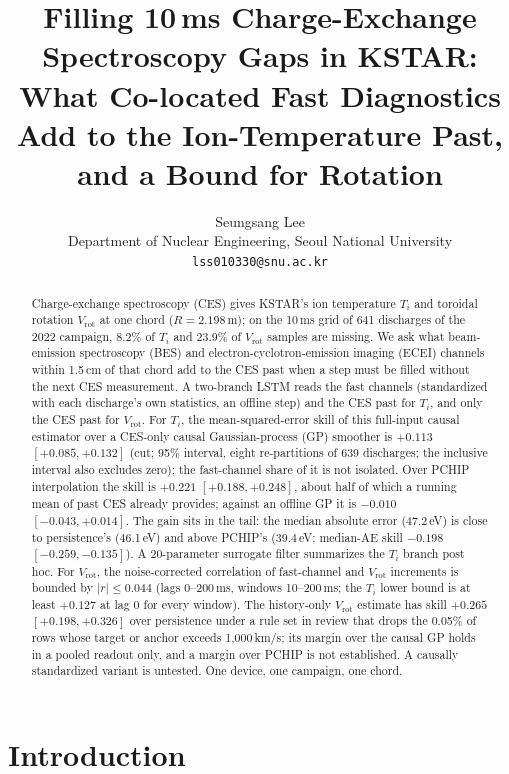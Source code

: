 \documentclass[10pt,twocolumn,letterpaper]{article}
\title{\vspace{-0.3in}\large\textbf{Filling 10\,ms Charge-Exchange Spectroscopy Gaps in KSTAR:
What Co-located Fast Diagnostics Add to the Ion-Temperature Past,
and a Bound for Rotation}}
\author{Seungsang Lee\\
  {\small Department of Nuclear Engineering, Seoul National University}\quad
  {\small\texttt{lss010330@snu.ac.kr}}}
\date{\vspace{-0.25in}}
\newcommand{\Ti}{\ensuremath{T_i}}
\newcommand{\Vrot}{\ensuremath{V_\mathrm{rot}}}
\begin{document}
\maketitle

\begin{abstract}
Charge-exchange spectroscopy (CES) gives KSTAR's ion temperature \Ti{} and toroidal
rotation \Vrot{} at one chord ($R = 2.198$\,m); on the 10\,ms grid of 641 discharges of
the 2022 campaign, 8.2\% of \Ti{} and 23.9\% of \Vrot{} samples are missing. We ask what
beam-emission spectroscopy (BES) and electron-cyclotron-emission imaging (ECEI) channels
within 1.5\,cm of that chord add to the CES past when a step must be filled without the
next CES measurement. A two-branch LSTM reads the fast channels (standardized with each
discharge's own statistics, an offline step) and the CES past for \Ti{}, and only the
CES past for \Vrot{}. For \Ti{}, the mean-squared-error skill of this full-input causal
estimator over a CES-only causal Gaussian-process (GP) smoother is $+0.113$
$[+0.085, +0.132]$ (cut; 95\% interval, eight re-partitions of 639 discharges; the
inclusive interval also excludes zero); the fast-channel share of it is not isolated.
Over PCHIP interpolation the skill is $+0.221$ $[+0.188, +0.248]$, about half of which
a running mean of past CES already provides; against an offline GP it is $-0.010$
$[-0.043, +0.014]$. The gain sits in the tail: the median absolute error (47.2\,eV) is
close to persistence's (46.1\,eV) and above PCHIP's (39.4\,eV; median-AE skill $-0.198$
$[-0.259, -0.135]$). A 20-parameter surrogate filter summarizes the \Ti{} branch post
hoc. For \Vrot{}, the noise-corrected correlation of fast-channel and \Vrot{} increments
is bounded by $|r| \leq 0.044$ (lags 0--200\,ms, windows 10--200\,ms; the \Ti{} lower
bound is at least $+0.127$ at lag 0 for every window). The history-only \Vrot{} estimate has
skill $+0.265$ $[+0.198, +0.326]$ over persistence under a rule set in review that
drops the 0.05\% of rows whose target or anchor exceeds 1{,}000\,km/s; its margin over
the causal GP holds in a pooled readout only, and a margin over PCHIP is not
established. A causally standardized variant is untested. One device, one campaign, one
chord.
\end{abstract}

\section{Introduction}
\label{sec:intro}
\end{document}
